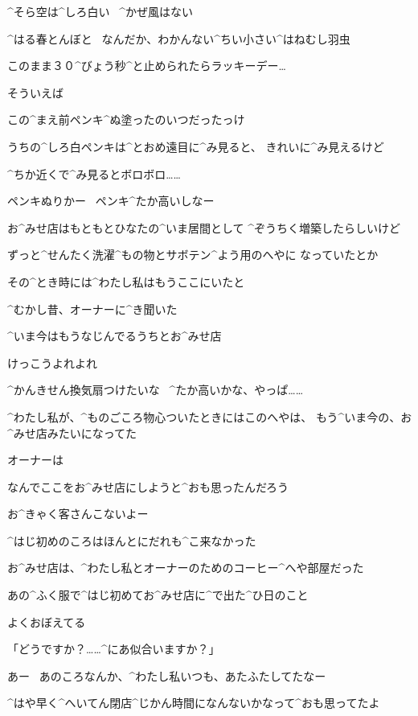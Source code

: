 \Alpha ^{そら}{空}は^{しろ}{白}い
\ ^{かぜ}{風}はない

\Alpha ^{はる}{春}とんぼと
\ なんだか、わかんない^{ちい}{小}さい^{はねむし}{羽虫}

\page
\Alpha このまま３０^{びょう}{秒}^{と}{止}められたらラッキーデー…

\page
\Alpha そういえば

\Alpha この^{まえ}{前}ペンキ^{ぬ}{塗}ったのいつだったっけ

\Alpha うちの^{しろ}{白}ペンキは^{とおめ}{遠目}に^{み}{見}ると、
きれいに^{み}{見}えるけど

\Alpha ^{ちか}{近}くで^{み}{見}るとボロボロ……

\Alpha ペンキぬりかー
\ ペンキ^{たか}{高}いしなー

\page
\Alpha お^{みせ}{店}はもともとひなたの^{いま}{居間}として
^{ぞうちく}{増築}したらしいけど

\Alpha ずっと^{せんたく}{洗濯}^{もの}{物}とサボテン^{よう}{用}のへやに
なっていたとか

\Alpha その^{とき}{時}には^{わたし}{私}はもうここにいたと

\Alpha ^{むかし}{昔}、オーナーに^{き}{聞}いた

\page
\Alpha ^{いま}{今}はもうなじんでるうちとお^{みせ}{店}

\Alpha けっこうよれよれ

\Alpha ^{かんきせん}{換気扇}つけたいな
\ ^{たか}{高}いかな、やっぱ……

\page
\Alpha ^{わたし}{私}が、^{ものごころ}{物心}ついたときにはこのへやは、
もう^{いま}{今}の、お^{みせ}{店}みたいになってた

\Alpha オーナーは

\Alpha なんでここをお^{みせ}{店}にしようと^{おも}{思}ったんだろう

\Alpha お^{きゃく}{客}さんこないよー

\page
\Alpha ^{はじ}{初}めのころはほんとにだれも^{こ}{来}なかった

\Alpha お^{みせ}{店}は、^{わたし}{私}とオーナーのためのコーヒー^{へや}{部屋}だった

\page
\Alpha あの^{ふく}{服}で^{はじ}{初}めてお^{みせ}{店}に^{で}{出}た^{ひ}{日}のこと

\Alpha よくおぼえてる

\Alpha 「どうですか？……^{にあ}{似合}いますか？」

\page
\Alpha あー
\ あのころなんか、^{わたし}{私}いつも、あたふたしてたなー

\Alpha ^{はや}{早}く^{へいてん}{閉店}^{じかん}{時間}になんないかなって^{おも}{思}ってたよ

